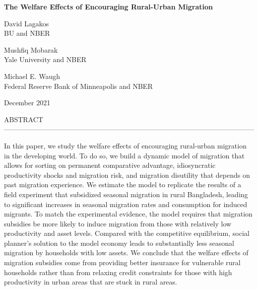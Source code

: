 \documentclass[12pt,pdftex]{article}
\begin{document}

\vspace{1.5cm}

{\large \textbf{The Welfare Effects of Encouraging Rural-Urban Migration}}

\vspace{0.4cm}

\normalsize David Lagakos \\ BU and NBER

\vspace{0.3cm}

\normalsize Mushfiq Mobarak \\ Yale University and NBER

\vspace{0.3cm}

Michael E. Waugh \\ Federal Reserve Bank of Minneapolis and NBER

\vspace{0.4cm}

December 2021

\vspace{0.3cm}

\normalsize

ABSTRACT ------------------------------------------------------------------------------------------------------------

\vspace{-0.05cm}
In this paper, we study the welfare effects of encouraging rural-urban migration in the developing world. To do so, we build a dynamic model of migration that allows for sorting on permanent comparative advantage, idiosyncratic productivity shocks and migration risk, and migration disutility that depends on past migration experience. We estimate the model to replicate the results of a field experiment that subsidized seasonal migration in rural Bangladesh, leading to significant increases in seasonal migration rates and consumption for induced migrants. To match the experimental evidence, the model requires that migration subsidies be more likely to induce migration from those with relatively low productivity and asset levels. Compared with the competitive equilibrium, social planner's solution to the model economy leads to substantially less seasonal migration by households with low assets. We conclude that the welfare effects of migration subsidies come from providing better insurance for vulnerable rural households rather than from relaxing credit constraints for those with high productivity in urban areas that are stuck in rural areas.
\vspace{-0.05cm}
\end{document}
